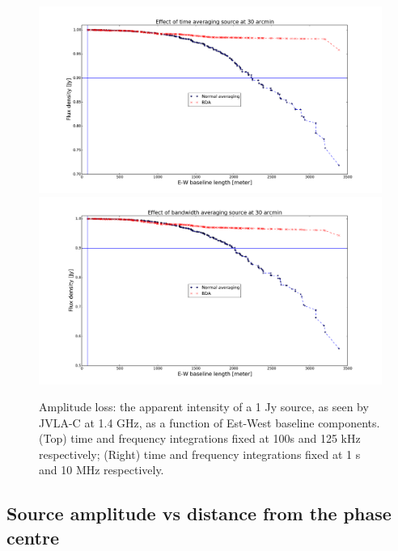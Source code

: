 \documentclass[useAMS,usenatbib]{mn2e}
\begin{document}
\begin{figure}
\includegraphics[width=\columnwidth]{./Figures/time_bda_navg.pdf}\\
\includegraphics[width=\columnwidth]{./Figures/bandwidth_bda_navg.pdf}
\caption{Amplitude loss: the apparent intensity of a 1 Jy source, as seen by JVLA-C at 1.4 GHz, 
as a function of Est-West baseline components. (Top) time and frequency integrations fixed at  100s and 125 kHz respectively; 
(Right) time and frequency integrations fixed at  1 s and 10 MHz respectively.}\label{fig:srcat30arcminx}
\end{figure}

\subsection{Source amplitude vs distance from the phase centre}
\end{document}

